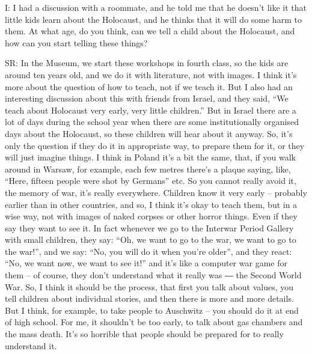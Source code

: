 I: I had a discussion with a roommate, and he told me that he doesn’t like it that little kids learn about the Holocaust, and he thinks that it will do some harm to them. At what age, do you think, can we tell a child about the Holocaust, and how can you start telling these things? 

 

SR: In the Museum, we start these workshops in fourth class, so the kids are around ten years old, and we do it with literature, not with images. I think it’s more about the question of how to teach, not if we teach it. But I also had an interesting discussion about this with friends from Israel, and they said, “We teach about Holocaust very early, very little children.” But in Israel there are a lot of days during the school year when there are some institutionally organised days about the Holocaust, so these children will hear about it anyway. So, it’s only the question if they do it in appropriate way, to prepare them for it, or they will just imagine things. I think in Poland it’s a bit the same, that, if you walk around in Warsaw, for example, each few metres there’s a plaque saying, like, “Here, fifteen people were shot by Germans” etc. So you cannot really avoid it, the memory of war, it’s really everywhere. Children know it very early – probably earlier than in other countries, and so, I think it’s okay to teach them, but in a wise way, not with images of naked corpses or other horror things. Even if they say they want to see it.  In fact whenever we go to the Interwar Period Gallery with small children, they say: “Oh, we want to go to the war, we want to go to the war!”, and we say: “No, you will do it when you’re older”, and they react: “No, we want now, we want to see it!” and it’s like a computer war game for them – of course, they don’t understand what it really was ― the Second World War. So, I think it should be the process, that first you talk about values, you tell children about individual stories, and then there is more and more details. But I think, for example, to take people to Auschwitz – you should do it at end of high school. For me, it shouldn’t be too early, to talk about gas chambers and the mass death. It’s so horrible that people should be prepared for to really understand it.  
